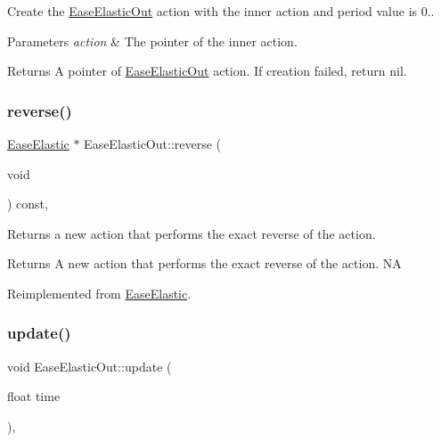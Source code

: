 Create the \hyperlink{classEaseElasticOut}{Ease\+Elastic\+Out} action with the inner action and period value is 0.. 


\begin{DoxyParams}{Parameters}
{\em action} & The pointer of the inner action. \\
\hline
\end{DoxyParams}
\begin{DoxyReturn}{Returns}
A pointer of \hyperlink{classEaseElasticOut}{Ease\+Elastic\+Out} action. If creation failed, return nil. 
\end{DoxyReturn}
\mbox{\label{classEaseElasticOut_a3da4544ffa360bd28296d2e120b2fdc9}} 
\subsubsection{\texorpdfstring{reverse()}{reverse()}}
{\footnotesize\ttfamily \hyperlink{classEaseElastic}{Ease\+Elastic} $\ast$ Ease\+Elastic\+Out\+::reverse (\begin{DoxyParamCaption}\item[{void}]{ }\end{DoxyParamCaption}) const\hspace{0.3cm}{\ttfamily [override]}, {\ttfamily [virtual]}}

Returns a new action that performs the exact reverse of the action.

\begin{DoxyReturn}{Returns}
A new action that performs the exact reverse of the action.  NA 
\end{DoxyReturn}


Reimplemented from \hyperlink{classEaseElastic_a9e0e8c55fbe1c50c706dd3d62834ed82}{Ease\+Elastic}.

\mbox{\label{classEaseElasticOut_a37dea32a0e909747540cc5625cd7893a}} 
\subsubsection{\texorpdfstring{update()}{update()}}
{\footnotesize\ttfamily void Ease\+Elastic\+Out\+::update (\begin{DoxyParamCaption}\item[{float}]{time }\end{DoxyParamCaption})\hspace{0.3cm}{\ttfamily [override]}, {\ttfamily [virtual]}}

